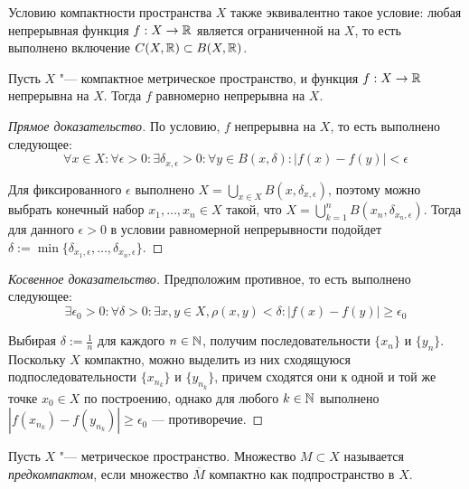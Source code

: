\begin{note}
    Условию компактности пространства $X$ также эквивалентно такое условие: любая непрерывная функция $f : X \to \mathbb{R}$ является ограниченной на $X$, то есть выполнено включение $C(X, \mathbb{R}) \subset B(X, \mathbb{R})$.
\end{note}

\begin{theorem}[Кантора]\label{thm3.3}
    Пусть $X$ "--- компактное метрическое пространство, и функция $f: X \to \mathbb{R}$ непрерывна на $X$. Тогда $f$ равномерно непрерывна на $X$.
\end{theorem}

\begin{proof}[Прямое доказательство]
    По условию, $f$ непрерывна на $X$, то есть выполнено следующее:
    \[\forall x \in X: \forall \epsilon > 0: \exists \delta_{x, \epsilon} > 0: \forall y \in B(x, \delta): |f(x) - f(y)| < \epsilon\]

    Для фиксированного $\epsilon$ выполнено $X = \bigcup_{x \in X}B(x, \delta_{x, \epsilon})$, поэтому можно выбрать конечный набор $x_1, \dotsc, x_n \in X$ такой, что $X = \bigcup_{k = 1}^nB(x_n, \delta_{x_n, \epsilon})$. Тогда для данного $\epsilon > 0$ в условии равномерной непрерывности подойдет $\delta := \min\{\delta_{x_1, \epsilon}, \dotsc, \delta_{x_n, \epsilon}\}$.
\end{proof}

\begin{proof}[Косвенное доказательство]
    Предположим противное, то есть выполнено следующее:
    \[\exists \epsilon_0 > 0: \forall \delta > 0: \exists x, y \in X, \rho(x, y) < \delta: |f(x) - f(y)| \ge \epsilon_0\]

    Выбирая $\delta := \frac 1n$ для каждого $n \in \mathbb{N}$, получим последовательности $\{x_n\}$ и $\{y_n\}$. Поскольку $X$ компактно, можно выделить из них сходящуюся подпоследовательности $\{x_{n_k}\}$ и $\{y_{n_k}\}$, причем сходятся они к одной и той же точке $x_0 \in X$ по построению, однако для любого $k \in \mathbb{N}$ выполнено $|f(x_{n_k}) - f(y_{n_k})| \ge \epsilon_0$ --- противоречие.
\end{proof}

\begin{definition}
    Пусть $X$ "--- метрическое пространство. Множество $M \subset X$ называется \textit{предкомпактом}, если множество $\overline M$ компактно как подпространство в $X$.
\end{definition}

